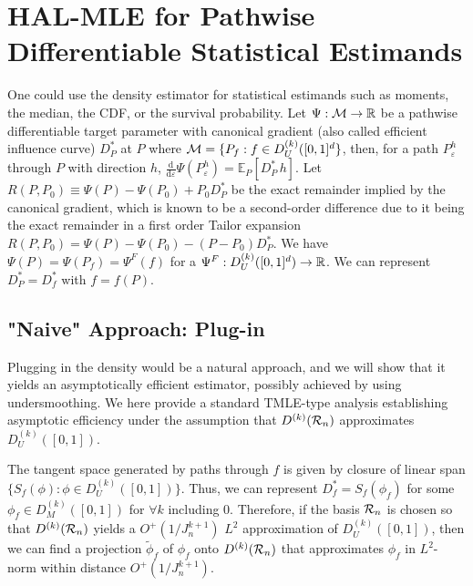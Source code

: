 \section{HAL-MLE for Pathwise Differentiable Statistical Estimands} \label{section:HAL-MLE for Pathwise Differentiable Statistical Estimands}
One could use the density estimator for statistical estimands such as moments, the median, the CDF, or the survival probability. Let $\Psi:{\cal M}\rightarrow \mathbb{R}$ be a pathwise differentiable target parameter with canonical gradient (also called efficient influence curve) $D^*_P$ at $P$ where ${\cal M}=\{P_f: f\in D^{(k)}_U([0,1]^d \}$, then, for a path $P_{\varepsilon}^h$ through $P$ with direction $h$, $\frac{\mathrm{d}}{\mathrm{d} \varepsilon} \Psi(P_{\varepsilon}^h) = \mathbb{E}_P[ D^*_P \, h]$. Let $R(P, P_0)\equiv \Psi(P)-\Psi(P_0)+P_0D^*_P$ be the exact remainder implied by the canonical gradient, which is known to be a second-order difference due to it being the exact remainder in a first order Tailor expansion $R(P,P_0)=\Psi(P)-\Psi(P_0)-(P-P_0)D^*_P$.
We have $\Psi(P)=\Psi(P_f)=\Psi^F(f)$ for a $\Psi^F: D^{(k)}_U([0,1]^d)\rightarrow \mathbb{R}$.
We can represent $D^*_P=D^*_f$ with $f=f(P)$.

\subsection{"Naive" Approach: Plug-in} \label{Plug-in HAL-MLE}
Plugging in the density would be a natural approach, and we will show that it yields an asymptotically efficient estimator, possibly achieved by using undersmoothing. We here provide a standard TMLE-type analysis establishing asymptotic efficiency under the assumption that $D^{(k)}({\cal R}_n)$ approximates $D^{(k)}_U([0,1])$. 

The tangent space generated by paths through $f$ is given by closure of linear span $\{S_f(\phi): \phi\in D^{(k)}_U([0,1])\}$. Thus, we can represent 
$D^*_f=S_f(\phi_f)$ for some $\phi_f\in D^{(k)}_M([0,1])$ for $\forall k$ including 0. Therefore, if the basis ${\cal R}_n$ is chosen so that $D^{(k)}({\cal R}_n)$  yields a $O^+(1/J_n^{k+1})$ $L^2$ approximation of $D^{(k)}_U([0,1])$, then we can find a projection $\tilde{\phi}_f$ of $\phi_f$ onto $D^{(k)}({\cal R}_n)$ that approximates $\phi_f$ in $L^2$-norm within distance $O^+(1/J_n^{k+1})$. 


